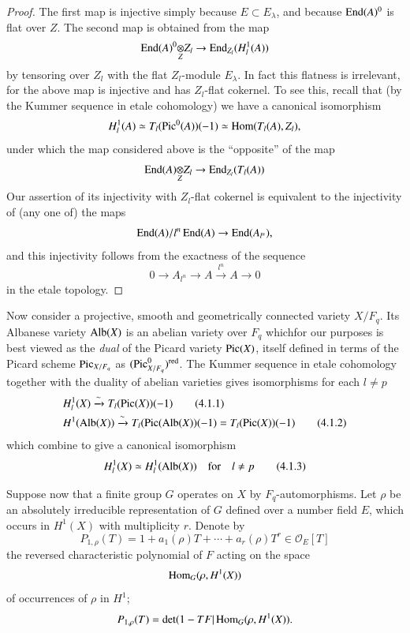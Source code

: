 \begin{proof}
The first map is injective simply because $E\subset E_{\lambda}$, and because $\operatorname{End}(A)^{0}$ is flat over $Z$. The second map is obtained from the map
$$
\foprod{\End(A)^{0}}{Z_{l}}{Z}\to \End_{Z_{l}}(H^{1}_{l}(A))
$$
by tensoring over $Z_{l}$ with the flat $Z_{l}$-module $E_{\lambda}$. In fact this flatness is irrelevant, for the above map is injective and has $Z_{l}$-flat cokernel. To see this, recall that (by the Kummer sequence in etale cohomology) we have a canonical isomorphism
$$
H^{1}_{l}(A)\simeq T_{l}(\operatorname{Pic}^{0}(A))(-1)\simeq \operatorname{Hom}(T_{l}(A),Z_{l}),
$$
under which the map considered above is the ``opposite'' of the map
$$
\foprod{\End(A)}{Z_{l}}{Z}\to \End_{Z_{l}}(T_{l}(A))
$$
Our assertion of its injectivity with $Z_{l}$-flat cokernel is equivalent to the injectivity of (any one of) the maps
$$
\operatorname{End}(A)/l^{n}\operatorname{End}(A)\to \operatorname{End}(A_{l^{n}}),
$$
and this injectivity follows from the exactness of the sequence
$$
0\to A_{l^{n}}\to A \xrightarrow{l^{n}} A\to 0
$$
in the etale topology.
\end{proof}

Now consider a projective, smooth and geometrically connected variety $X/F_{q}$. Its Albanese variety $\operatorname{Alb}(X)$ is an abelian variety over $F_{q}$ which\pageoriginale for our purposes is best viewed as the {\em dual} of the Picard variety $\operatorname{Pic}(X)$, itself defined in terms of the Picard scheme $\operatorname{Pic}_{X/F_{q}}$ as $(\operatorname{Pic}^{0}_{X/F_{q}})^{\operatorname{red}}$. The Kummer sequence in etale cohomology together with the duality of abelian varieties gives isomorphisms for each $l\neq p$
\begin{align*}
& H^{1}_{l}(X)\xrightarrow{\sim}T_{l}(\operatorname{Pic}(X))(-1)\tag{4.1.1}\label{art6-eq4.1.1}\\
& H^{1}(\operatorname{Alb}(X))\xrightarrow{\sim}T_{l}(\operatorname{Pic}(\operatorname{Alb}(X))(-1)=T_{l}(\operatorname{Pic}(X))(-1)\tag{4.1.2}\label{art6-eq4.1.2}
\end{align*}
which combine to give a canonical isomorphism
\begin{equation*}
H^{1}_{l}(X)\simeq H^{1}_{l}(\operatorname{Alb}(X))\quad\text{for}\quad l\neq p\tag{4.1.3}\label{art6-eq4.1.3}
\end{equation*}

Suppose now that a finite group $G$ operates on $X$ by $F_{q}$-automor\-phisms. Let $\rho$ be an absolutely irreducible representation of $G$ defined over a number field $E$, which occurs in $H^{1}(X)$ with multiplicity $r$. Denote by
$$
P_{1,\rho}(T)=1+a_{1}(\rho)T+\cdots+a_{r}(\rho)T^{r}\in \mathscr{O}_{E}[T]
$$
the reversed characteristic polynomial of $F$ acting on the space 
$$
\operatorname{Hom}_{G}(\rho,H^{1}(X))
$$ 
of occurrences of $\rho$ in $H^{1}$;
$$
P_{1,\rho}(T)=\det (1-TF|\operatorname{Hom}_{G}(\rho,H^{1}(X)).
$$

